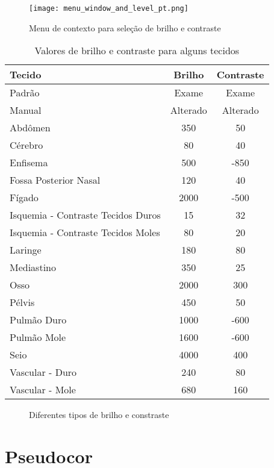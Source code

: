 \begin{figure}[!htb]
\centering
\texttt{[image: menu\_window\_and\_level\_pt.png]}
\caption{Menu de contexto para seleção de brilho e contraste}
\label{fig:window_level}
\end{figure}

\begin{table}[h]
\centering
\caption{Valores de brilho e contraste para alguns tecidos}
\begin{tabular}{lcc}\\
\hline %
Tecido & Brilho & Contraste\\
\hline
\hline
Padrão & Exame & Exame\\
Manual & Alterado & Alterado\\
Abdômen & 350 & 50 \\
Cérebro & 80 & 40\\
Enfisema & 500 & -850\\
Fossa Posterior Nasal & 120 & 40\\
Fígado & 2000 & -500\\
Isquemia - Contraste Tecidos Duros & 15 & 32\\
Isquemia - Contraste Tecidos Moles & 80 & 20\\
Laringe & 180 & 80\\
Mediastino & 350 & 25\\
Osso & 2000 & 300\\
Pélvis & 450 & 50\\
Pulmão Duro & 1000 & -600\\
Pulmão Mole & 1600 & -600\\
Seio & 4000 & 400\\
Vascular - Duro & 240 & 80\\
Vascular - Mole & 680 & 160\\
\hline
\end{tabular}
\label{tab:window_level}
\end{table} 

\begin{figure}
  \centering
  \caption{Diferentes tipos de brilho e constraste}
  \label{fig:two_window_level}
\end{figure}


\section{Pseudocor}

